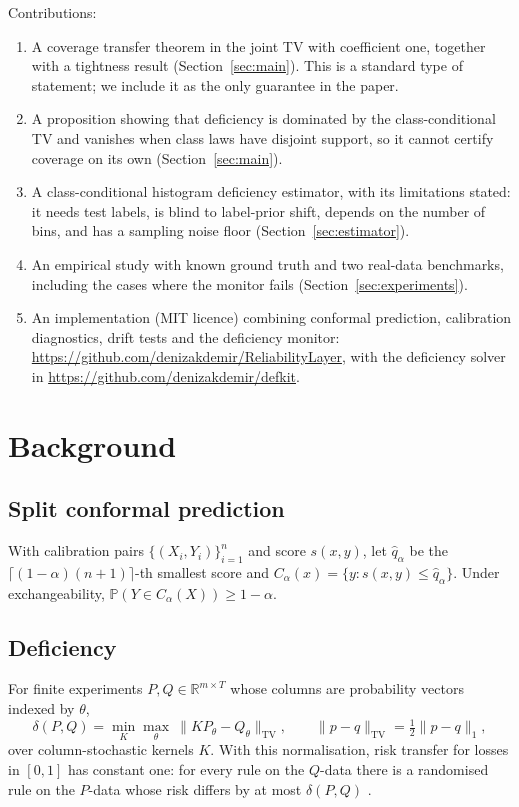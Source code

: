 \documentclass{article}
\renewcommand{\P}{\mathbb{P}}
\newcommand{\TV}[2]{\|#1 - #2\|_{\mathrm{TV}}}
\begin{document}
Contributions:
\begin{enumerate}
  \item A coverage transfer theorem in the joint TV with coefficient one,
  together with a tightness result (Section~\ref{sec:main}). This is a
  standard type of statement; we include it as the only guarantee in the paper.
  \item A proposition showing that deficiency is dominated by the
  class-conditional TV and vanishes when class laws have disjoint support, so
  it cannot certify coverage on its own (Section~\ref{sec:main}).
  \item A class-conditional histogram deficiency estimator, with its
  limitations stated: it needs test labels, is blind to label-prior shift,
  depends on the number of bins, and has a sampling noise floor
  (Section~\ref{sec:estimator}).
  \item An empirical study with known ground truth and two real-data
  benchmarks, including the cases where the monitor fails
  (Section~\ref{sec:experiments}).
  \item An implementation (MIT licence) combining conformal prediction,
  calibration diagnostics, drift tests and the deficiency monitor:
  \url{https://github.com/denizakdemir/ReliabilityLayer}, with the
  deficiency solver in \url{https://github.com/denizakdemir/defkit}.
\end{enumerate}

\section{Background}

\subsection{Split conformal prediction}
With calibration pairs $\{(X_i,Y_i)\}_{i=1}^n$ and score $s(x,y)$, let
$\widehat q_\alpha$ be the $\lceil(1-\alpha)(n+1)\rceil$-th smallest score and
$C_\alpha(x)=\{y: s(x,y)\le\widehat q_\alpha\}$. Under exchangeability,
$\P(Y\in C_\alpha(X))\ge 1-\alpha$.

\subsection{Deficiency}
For finite experiments $P,Q\in\mathbb{R}^{m\times T}$ whose columns are
probability vectors indexed by $\theta$,
\[
\delta(P,Q)=\min_{K}\max_{\theta}\ \TV{KP_\theta}{Q_\theta},
\qquad \TV{p}{q}=\tfrac12\|p-q\|_1,
\]
over column-stochastic kernels $K$. With this normalisation, risk transfer for
losses in $[0,1]$ has constant one: for every rule on the $Q$-data there is a
randomised rule on the $P$-data whose risk differs by at most $\delta(P,Q)$
\citep{lecam1986asymptotic,torgersen1991comparison}.
\end{document}
